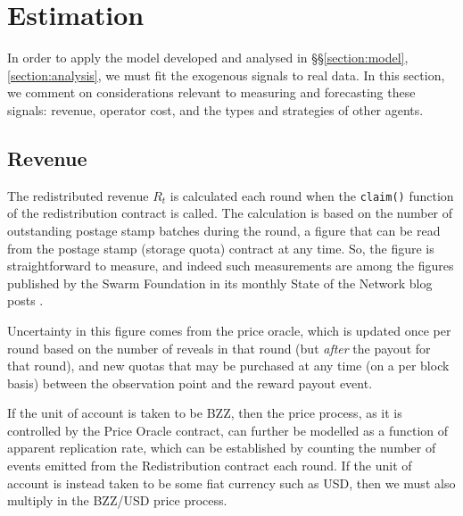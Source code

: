 \section{Estimation}
\label{section:estimation}

In order to apply the model developed and analysed in \S\S\ref{section:model},\ref{section:analysis}, we must fit the exogenous signals to real data.
%
In this section, we comment on considerations relevant to measuring and forecasting these signals: revenue, operator cost, and the types and strategies of other agents.


\subsection{Revenue}
\label{section:revenue}

The redistributed revenue $R_t$ is calculated each round when the \texttt{claim()} function of the redistribution contract is called.
%
The calculation is based on the number of outstanding postage stamp batches during the round, a figure that can be read from the postage stamp (storage quota) contract at any time.
%
So, the figure is straightforward to measure, and indeed such measurements are among the figures published by the Swarm Foundation in its monthly State of the Network blog posts \cite{soft}.

Uncertainty in this figure comes from the price oracle, which is updated once per round based on the number of reveals in that round (but \emph{after} the payout for that round), and new quotas that may be purchased at any time (on a per block basis) between the observation point and the reward payout event.

If the unit of account is taken to be BZZ, then the price process, as it is controlled by the Price Oracle contract, can further be modelled as a function of apparent replication rate, which can be established by counting the number of  events emitted from the Redistribution contract each round.
%
If the unit of account is instead taken to be some fiat currency such as USD, then we must also multiply in the BZZ/USD price process.



